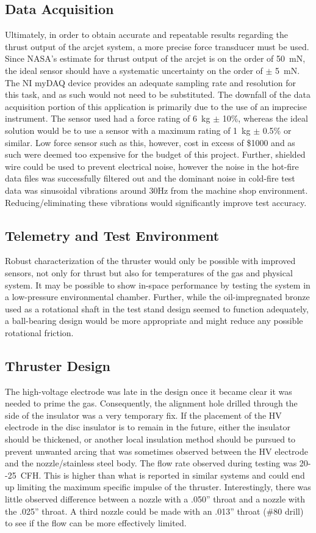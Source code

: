 \documentclass[journal]{IEEEtran}
\begin{document}
\subsection{Data Acquisition}
Ultimately, in order to obtain accurate and repeatable results regarding the thrust output of the arcjet system, a more precise force transducer must be used.
Since NASA's estimate for thrust output of the arcjet is on the order of \SI{50}{\milli\newton}, the ideal sensor should have a systematic uncertainty on the order of $\pm$ \SI{5}{\milli\newton}.
The NI myDAQ device provides an adequate sampling rate and resolution for this task, and as such would not need to be substituted.
The downfall of the data acquisition portion of this application is primarily due to the use of an imprecise instrument.
The sensor used had a force rating of \SI{6}{\kilo\gram} $\pm$ 10\%, whereas the ideal solution would be to use a sensor with a maximum rating of \SI{1}{\kilo\gram} $\pm$ 0.5\% or similar.
Low force sensor such as this, however, cost in excess of \$1000 and as such were deemed too expensive for the budget of this project.
Further, shielded wire could be used to prevent electrical noise, however the noise in the hot-fire data files was successfully filtered out and the dominant noise in cold-fire test data was sinusoidal vibrations around 30Hz from the machine shop environment. Reducing/eliminating these vibrations would significantly improve test accuracy.
\subsection{Telemetry and Test Environment}
Robust characterization of the thruster would only be possible with improved sensors, not only for thrust but also for temperatures of the gas and physical system.
It may be possible to show in-space performance by testing the system in a low-pressure environmental chamber. Further, while the oil-impregnated bronze used as a rotational shaft in the test stand design seemed to function adequately, a ball-bearing design would be more appropriate and might reduce any possible rotational friction.
\subsection{Thruster Design}
The high-voltage electrode was late in the design once it became clear it was needed to prime the gas. Consequently, the alignment hole drilled through the side of the insulator was a very temporary fix. If the placement of the HV electrode in the disc insulator is to remain in the future, either the insulator should be thickened, or another local insulation method should be pursued to prevent unwanted arcing that was sometimes observed between the HV electrode and the nozzle/stainless steel body.
The flow rate observed during testing was \SI{20--25}{CFH}. This is higher than what is reported in similar systems and could end up limiting the maximum specific impulse of the thruster. Interestingly, there was little observed difference between a nozzle with a .050'' throat and a nozzle with the .025'' throat. A third nozzle could be made with an .013'' throat ($\#$80 drill) to see if the flow can be more effectively limited. 
\end{document}
